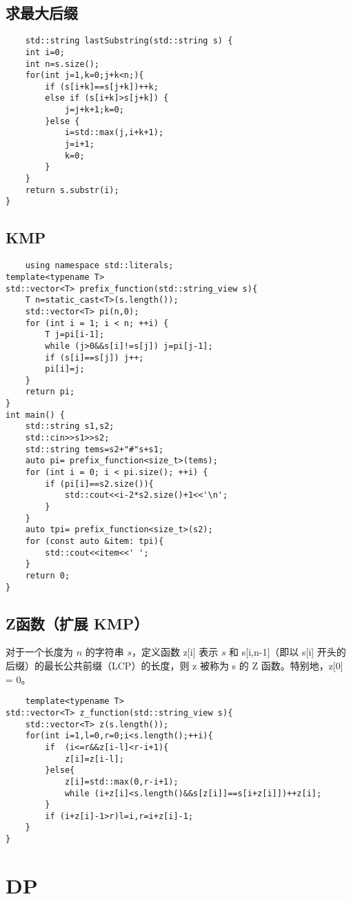 \documentclass[UTF8]{ctexart}
\begin{document}
\subsection{求最大后缀}
\begin{lstlisting}
    std::string lastSubstring(std::string s) {
    int i=0;
    int n=s.size();
    for(int j=1,k=0;j+k<n;){
        if (s[i+k]==s[j+k])++k;
        else if (s[i+k]>s[j+k]) {
            j=j+k+1;k=0;
        }else {
            i=std::max(j,i+k+1);
            j=i+1;
            k=0;
        }
    }
    return s.substr(i);
}
\end{lstlisting}
\subsection{KMP}
\begin{lstlisting}
    using namespace std::literals;
template<typename T>
std::vector<T> prefix_function(std::string_view s){
    T n=static_cast<T>(s.length());
    std::vector<T> pi(n,0);
    for (int i = 1; i < n; ++i) {
        T j=pi[i-1];
        while (j>0&&s[i]!=s[j]) j=pi[j-1];
        if (s[i]==s[j]) j++;
        pi[i]=j;
    }
    return pi;
}
int main() {
    std::string s1,s2;
    std::cin>>s1>>s2;
    std::string tems=s2+"#"s+s1;
    auto pi= prefix_function<size_t>(tems);
    for (int i = 0; i < pi.size(); ++i) {
        if (pi[i]==s2.size()){
            std::cout<<i-2*s2.size()+1<<'\n';
        }
    }
    auto tpi= prefix_function<size_t>(s2);
    for (const auto &item: tpi){
        std::cout<<item<<' ';
    }
    return 0;
}
\end{lstlisting}
\subsection{Z函数（扩展 KMP）}
对于一个长度为 $n$ 的字符串 
$s$，定义函数 z[i] 表示 $s$ 和 s[i,n-1]（即以 s[i] 开头的后缀）的最长公共前缀（LCP）的长度，则 z 被称为 s 的 Z 函数。特别地，z[0] = 0。
\begin{lstlisting}
    template<typename T>
std::vector<T> z_function(std::string_view s){
    std::vector<T> z(s.length());
    for(int i=1,l=0,r=0;i<s.length();++i){
        if  (i<=r&&z[i-l]<r-i+1){
            z[i]=z[i-l];
        }else{
            z[i]=std::max(0,r-i+1);
            while (i+z[i]<s.length()&&s[z[i]]==s[i+z[i]])++z[i];
        }
        if (i+z[i]-1>r)l=i,r=i+z[i]-1;
    }
}
\end{lstlisting}
\section{DP}
\end{document}
